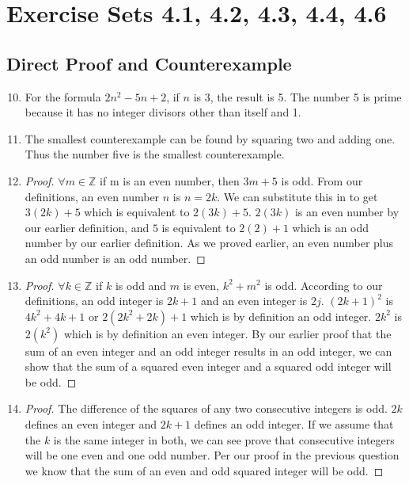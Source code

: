 \documentclass[12pt]{article}
\begin{document}

\setcounter{section}{4}
\section*{Exercise Sets 4.1, 4.2, 4.3, 4.4, 4.6}
\subsection{Direct Proof and Counterexample}
\begin{enumerate}
  \setcounter{enumi}{9}
\item %
For the formula $2n^{2}-5n+2$, if $n$ is 3, the result is 5. The
number 5 is prime because it has no integer divisors other than itself
and 1.
  \setcounter{enumi}{11}
\item %
The smallest counterexample can be found by squaring two and adding
one. Thus the number five is the smallest counterexample.
  \setcounter{enumi}{29}
\item %
\begin{proof}
  $\forall m \in \mathbb{Z}$ if m is an even number, then $3m + 5$ is
  odd.
  From our definitions, an even number $n$ is $n = 2k$. We can
  substitute this in to get $3(2k) + 5$ which is equivalent to $2(3k)
  + 5$.
  $2(3k)$ is an even number by our earlier definition, and $5$ is
  equivalent to $2(2)+1$ which is an odd number by our earlier
  definition.
  As we proved earlier, an even number plus an odd number is an odd number.
\end{proof}
\item %
  \begin{proof}
      $\forall k \in \mathbb{Z}$ if $k$ is odd and $m$ is even, $k^{2} + m^{2}$ is odd.
      According to our definitions, an odd integer is $2k + 1$ and an even integer is $2j$.
      $(2k + 1)^{2}$ is $4k^{2} + 4k + 1$ or $2(2k^{2}+2k) + 1$ which is by definition an odd integer.
      $2k^{2}$ is $2(k^{2})$ which is by definition an even integer.
By our earlier proof that the sum of an even integer and an odd integer results in an odd integer, we can show
that the sum of a squared even integer and a squared odd integer will be odd.
  \end{proof}
  \setcounter{enumi}{57}
\item %
  \begin{proof}
    The difference of the squares of any two consecutive integers is odd.
    $2k$ defines an even integer and $2k + 1$ defines an odd integer. If we assume that the $k$ is the same
    integer in both, we can see prove that consecutive integers will be one even and one odd number.
    Per our proof in the previous question we know that the sum of an even and odd squared integer will be odd.
  \end{proof}

\end{enumerate}
\end{document}
